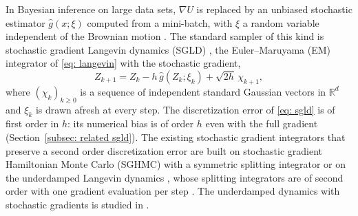 \documentclass{article}
\newcommand{\Ge}{\geqslant}
\numberwithin{equation}{section}
\begin{document}
In Bayesian inference on large data sets, $\nabla U$ is replaced by an unbiased stochastic estimator $\hat g(x; \xi)$ computed from a mini-batch, with $\xi$ a random variable independent of the Brownian motion \citep{welling2011bayesian, chen2015convergence, teh2016consistency, vollmer2016exploration}. The standard sampler of this kind is stochastic gradient Langevin dynamics (SGLD) \citep{welling2011bayesian}, the Euler--Maruyama (EM) integrator \citep{kloeden1992numerical, milstein2004stochastic} of \eqref{eq: langevin} with the stochastic gradient,
\begin{equation}
    Z_{k+1} = Z_k - h\, \hat g(Z_k; \xi_k) + \sqrt{2h}\, \chi_{k+1} ,
    \label{eq: sgld}
    \tag{SGLD}
\end{equation}
where $(\chi_k)_{k \Ge 0}$ is a sequence of independent standard Gaussian vectors in $\mathbb R^d$ and $\xi_k$ is drawn afresh at every step. The discretization error of \eqref{eq: sgld} is of first order in $h$: its numerical bias is of order $h$ even with the full gradient (Section~\ref{subsec: related sgld}). The existing stochastic gradient integrators that preserve a second order discretization error are built on stochastic gradient Hamiltonian Monte Carlo (SGHMC) \citep{chen2014stochastic} with a symmetric splitting integrator \citep{chen2015convergence} or on the underdamped Langevin dynamics \citep{gouraud2025hmc}, whose splitting integrators are of second order with one gradient evaluation per step \citep{monmarche2021high}. The underdamped dynamics with stochastic gradients is studied in \citep{leimkuhler2016adaptive, matthews2018langevin, paulin2025sampling, lu2025mse}.
\end{document}
